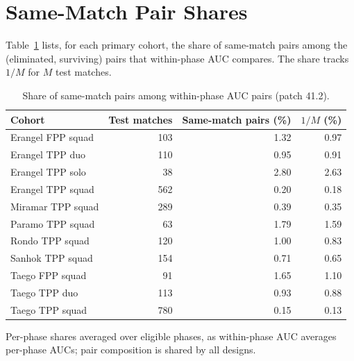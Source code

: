 \documentclass[sigconf,anonymous,nonacm]{acmart}
\begin{document}
\section{Same-Match Pair Shares}
Table~\ref{tab:pairshare} lists, for each primary cohort, the share of same-match pairs among the (eliminated, surviving) pairs that within-phase AUC compares. The share tracks $1/M$ for $M$ test matches.
\begin{table}[t]
\centering\footnotesize
\caption{Share of same-match pairs among within-phase AUC pairs (patch 41.2).}
\label{tab:pairshare}
\begin{tabular}{lrrr}
\toprule
Cohort & Test matches & Same-match pairs (\%) & $1/M$ (\%) \\
\midrule
Erangel FPP squad & 103 & 1.32 & 0.97 \\
Erangel TPP duo & 110 & 0.95 & 0.91 \\
Erangel TPP solo & 38 & 2.80 & 2.63 \\
Erangel TPP squad & 562 & 0.20 & 0.18 \\
Miramar TPP squad & 289 & 0.39 & 0.35 \\
Paramo TPP squad & 63 & 1.79 & 1.59 \\
Rondo TPP squad & 120 & 1.00 & 0.83 \\
Sanhok TPP squad & 154 & 0.71 & 0.65 \\
Taego FPP squad & 91 & 1.65 & 1.10 \\
Taego TPP duo & 113 & 0.93 & 0.88 \\
Taego TPP squad & 780 & 0.15 & 0.13 \\
\bottomrule
\end{tabular}
\smallskip
\parbox{\columnwidth}{\scriptsize Per-phase shares averaged over eligible phases, as within-phase AUC averages per-phase AUCs; pair composition is shared by all designs.}
\end{table}
\end{document}
